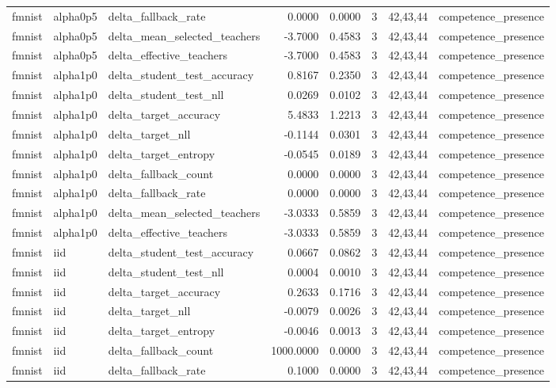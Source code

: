 \begin{tabular}{lllrrrll}
fmnist & alpha0p5 & delta\_fallback\_rate & 0.0000 & 0.0000 & 3 & 42,43,44 & competence\_presence \\
fmnist & alpha0p5 & delta\_mean\_selected\_teachers & -3.7000 & 0.4583 & 3 & 42,43,44 & competence\_presence \\
fmnist & alpha0p5 & delta\_effective\_teachers & -3.7000 & 0.4583 & 3 & 42,43,44 & competence\_presence \\
fmnist & alpha1p0 & delta\_student\_test\_accuracy & 0.8167 & 0.2350 & 3 & 42,43,44 & competence\_presence \\
fmnist & alpha1p0 & delta\_student\_test\_nll & 0.0269 & 0.0102 & 3 & 42,43,44 & competence\_presence \\
fmnist & alpha1p0 & delta\_target\_accuracy & 5.4833 & 1.2213 & 3 & 42,43,44 & competence\_presence \\
fmnist & alpha1p0 & delta\_target\_nll & -0.1144 & 0.0301 & 3 & 42,43,44 & competence\_presence \\
fmnist & alpha1p0 & delta\_target\_entropy & -0.0545 & 0.0189 & 3 & 42,43,44 & competence\_presence \\
fmnist & alpha1p0 & delta\_fallback\_count & 0.0000 & 0.0000 & 3 & 42,43,44 & competence\_presence \\
fmnist & alpha1p0 & delta\_fallback\_rate & 0.0000 & 0.0000 & 3 & 42,43,44 & competence\_presence \\
fmnist & alpha1p0 & delta\_mean\_selected\_teachers & -3.0333 & 0.5859 & 3 & 42,43,44 & competence\_presence \\
fmnist & alpha1p0 & delta\_effective\_teachers & -3.0333 & 0.5859 & 3 & 42,43,44 & competence\_presence \\
fmnist & iid & delta\_student\_test\_accuracy & 0.0667 & 0.0862 & 3 & 42,43,44 & competence\_presence \\
fmnist & iid & delta\_student\_test\_nll & 0.0004 & 0.0010 & 3 & 42,43,44 & competence\_presence \\
fmnist & iid & delta\_target\_accuracy & 0.2633 & 0.1716 & 3 & 42,43,44 & competence\_presence \\
fmnist & iid & delta\_target\_nll & -0.0079 & 0.0026 & 3 & 42,43,44 & competence\_presence \\
fmnist & iid & delta\_target\_entropy & -0.0046 & 0.0013 & 3 & 42,43,44 & competence\_presence \\
fmnist & iid & delta\_fallback\_count & 1000.0000 & 0.0000 & 3 & 42,43,44 & competence\_presence \\
fmnist & iid & delta\_fallback\_rate & 0.1000 & 0.0000 & 3 & 42,43,44 & competence\_presence \\

\end{tabular}

